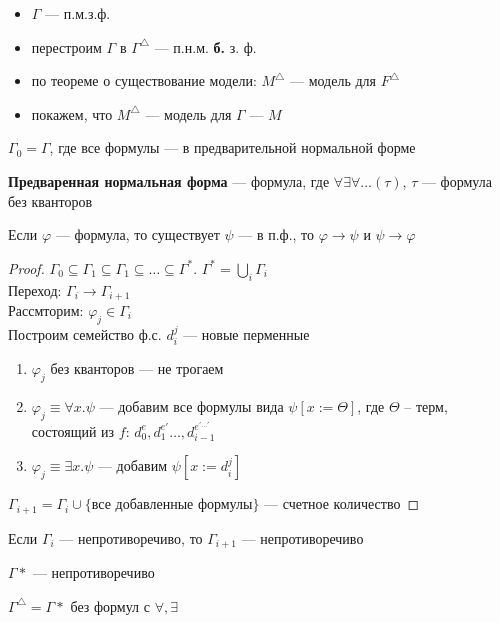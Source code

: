 \documentclass[oneside]{book}
\begin{document}
\begin{itemize}
	\item \(\Gamma\) --- п.м.з.ф.
	\item перестроим \(\Gamma\) в \(\Gamma^\triangle\) --- п.н.м. \textbf{б.} з. ф.
	\item по теореме о существование модели: \(M^\triangle\) --- модель для \(F^\triangle\)
	\item покажем, что \(M^\triangle\) --- модель для \(\Gamma\) --- \(M\)
\end{itemize}
\(\Gamma_0 = \Gamma\), где все формулы --- в предварительной нормальной форме
\begin{definition}
	\textbf{Предваренная нормальная форма} --- формула, где \(\forall \exists \forall \dots(\tau)\), \(\tau\) --- формула без кванторов
	\label{orgcad5a16}
\end{definition}
\begin{theorem}
	Если \(\varphi\) --- формула, то существует \(\psi\) --- в п.ф., то \(\varphi \to \psi\) и \(\psi \to \varphi\)
	\label{org809bccb}
\end{theorem}
\begin{proof}
	\(\Gamma_0 \subseteq \Gamma_1 \subseteq \Gamma_1 \subseteq \dots \subseteq \Gamma^*\). \(\Gamma^* = \bigcup_i \Gamma_i\) \\
	Переход: \(\Gamma_i \to \Gamma_{i + 1}\) \\
	Рассмторим: \(\varphi_j \in \Gamma_i\) \\
	Построим семейство ф.с. \(d^j_i\) --- новые перменные
	\begin{enumerate}
		\item \(\varphi_j\) без кванторов --- не трогаем
		\item \(\varphi_j \equiv \forall x. \psi\) --- добавим все формулы вида \(\psi[x := \Theta]\), где \(\Theta\) -- терм, состоящий из \(f\): \(d_0^e, d_1^{e'} \dots , d_{i - 1}^{e^{'\dots'}}\)
		\item \(\varphi_j \equiv \exists x. \psi\) --- добавим \(\psi[x:=d^j_i]\)
	\end{enumerate}
	\(\Gamma_{i + 1} = \Gamma_i \cup \{\text{все добавленные формулы}\}\) --- счетное количество
\end{proof}
\begin{theorem}
	Если \(\Gamma_i\) --- непротиворечиво, то \(\Gamma_{i + 1}\) --- непротиворечиво
	\label{org5727e25}
\end{theorem}
\begin{theorem}
	\(\Gamma*\) --- непротиворечиво
	\label{org2cda439}
\end{theorem}
\begin{corollary}
	\(\Gamma^\triangle = \Gamma*\) без формул с \(\forall, \exists\)
	\label{org448bae2}
\end{corollary}
\end{document}
